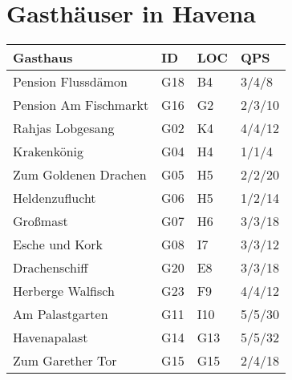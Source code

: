\documentclass[14pt]{article}
\author{conrad}
\date{\today}
\title{}
\begin{document}
\section*{Gasth\"auser in Havena}
\begin{center}
\Large
\begin{tabular}{|llll|} \hline
Gasthaus & ID & LOC & QPS\\ \hline \hline
Pension Flussdämon & G18 & B4 & 3/4/8\\ \hline
Pension Am Fischmarkt & G16 & G2 & 2/3/10\\ \hline
Rahjas Lobgesang & G02 & K4 & 4/4/12\\ \hline
Krakenkönig & G04 & H4 & 1/1/4\\ \hline
Zum Goldenen Drachen & G05 & H5 & 2/2/20\\ \hline
Heldenzuflucht & G06 & H5 & 1/2/14\\ \hline
Großmast & G07 & H6 & 3/3/18\\ \hline
Esche und Kork & G08 & I7 & 3/3/12\\ \hline
Drachenschiff & G20 & E8 & 3/3/18\\ \hline
Herberge Walfisch & G23 & F9 & 4/4/12\\ \hline
Am Palastgarten & G11 & I10 & 5/5/30\\ \hline
Havenapalast & G14 & G13 & 5/5/32\\ \hline
Zum Garether Tor & G15 & G15 & 2/4/18\\ \hline
\end{tabular}
\end{center}
\end{document}
